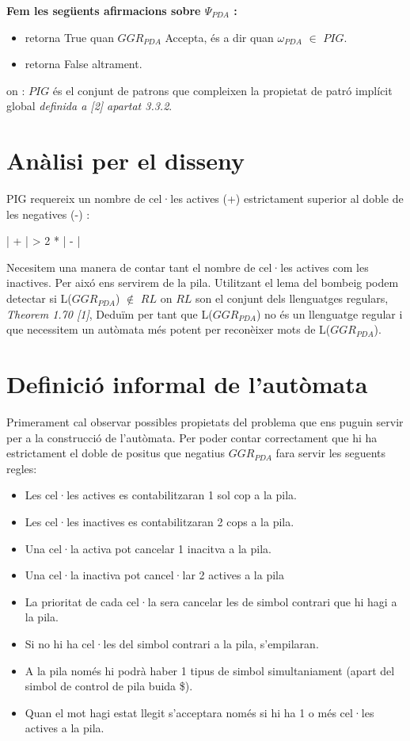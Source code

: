 \documentclass[12pt,a4paper]{report}
\def \wpda{$\omega_{PDA} $}
\def \pda{$GGR_{PDA} $}
\def \postPDA{$\Psi_{PDA}$}
\begin{document}
\textbf{Fem les següents afirmacions sobre \postPDA{} :}
\begin{itemize}
\item retorna True quan \pda{} Accepta, és a dir quan \wpda{} $\in$ $PIG$.
\item retorna False altrament.
\end{itemize}
on : $PIG$ és el conjunt de patrons que compleixen la propietat de patró implícit global \textit{definida a [2] apartat 3.3.2}.

\section{Anàlisi per el disseny}

PIG requereix un nombre de cel·les actives (+) estrictament superior al doble de les negatives (-) : 

\begin{center}
| + | > 2 * | - |
\end{center}

Necesitem una manera de contar tant el nombre de cel·les actives com les inactives. Per aixó ens servirem de la pila. Utilitzant el lema del bombeig podem detectar si L(\pda{}) $\not\in$ $RL$ on $RL$ son el conjunt dels llenguatges regulars, \textit{Theorem 1.70 [1]}, Deduïm per tant que L(\pda) no és un llenguatge regular i que necessitem un autòmata més potent per reconèixer mots de L(\pda).

\section{Definició informal de l’autòmata}

Primerament cal observar possibles propietats del problema que ens puguin servir per a la construcció de l’autòmata. Per poder contar correctament que hi ha estrictament el doble de positus que negatius \pda{} fara servir les seguents regles:

\begin{itemize}
\item Les cel·les actives es contabilitzaran 1 sol cop a la pila.
\item Les cel·les inactives es contabilitzaran 2 cops a la pila.
\item Una cel·la activa pot cancelar 1 inacitva a la pila.
\item Una cel·la inactiva pot cancel·lar 2 actives a la pila
\item La prioritat de cada cel·la sera cancelar les de simbol contrari que hi hagi a la pila.
\item Si no hi ha cel·les del simbol contrari a la pila, s’empilaran.
\item A la pila només hi podrà haber 1 tipus de simbol simultaniament (apart del simbol de control de pila buida \$).
\item Quan el mot hagi estat llegit s’acceptara només si hi ha 1 o més cel·les actives a la pila.
\end{itemize}
\end{document}
